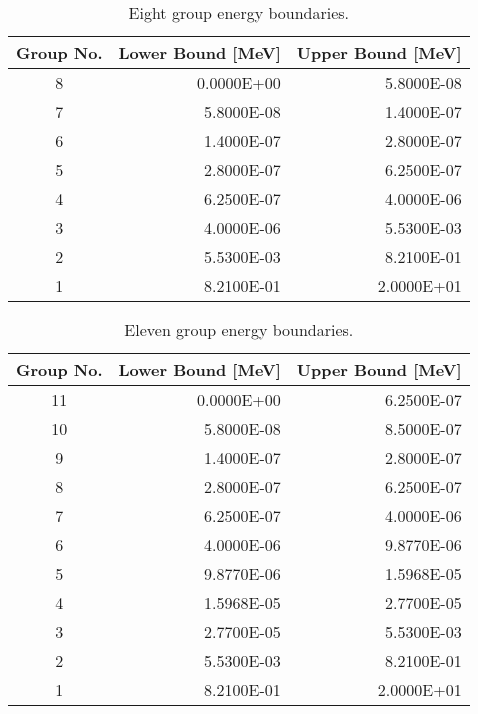 \begin{appendices}
\begin{table}[h!]
  \centering
  \footnotesize
  \caption{Eight group energy boundaries.}
  \label{table:app-8-groups} 
  \vspace{14pt}
  \begin{tabular}{c r r}
    \toprule
    {\bf Group No.} &
    {\bf Lower Bound [MeV]} &
    {\bf Upper Bound [MeV]} \\
    \midrule
8 & 0.0000E+00 & 5.8000E-08 \\
7 & 5.8000E-08 & 1.4000E-07 \\
6 & 1.4000E-07 & 2.8000E-07 \\
5 & 2.8000E-07 & 6.2500E-07 \\
4 & 6.2500E-07 & 4.0000E-06 \\
3 & 4.0000E-06 & 5.5300E-03 \\
2 & 5.5300E-03 & 8.2100E-01 \\
1 & 8.2100E-01 & 2.0000E+01 \\
  \bottomrule
 \end{tabular}
\end{table}

\begin{table}[h!]
	\centering
	\footnotesize
	\caption{Eleven group energy boundaries.}
	\label{table:app-11-groups} 
	\vspace{14pt}
	\begin{tabular}{c r r}
		\toprule
		{\bf Group No.} &
		{\bf Lower Bound [MeV]} &
		{\bf Upper Bound [MeV]} \\
		\midrule
		11 & 0.0000E+00 & 6.2500E-07 \\
		10 & 5.8000E-08 & 8.5000E-07 \\
		9 & 1.4000E-07 & 2.8000E-07 \\
		8 & 2.8000E-07 & 6.2500E-07 \\
		7 & 6.2500E-07 & 4.0000E-06 \\
		6 & 4.0000E-06 & 9.8770E-06 \\
		5 & 9.8770E-06 & 1.5968E-05 \\
		4 & 1.5968E-05 & 2.7700E-05 \\
		3 & 2.7700E-05 & 5.5300E-03 \\
		2 & 5.5300E-03 & 8.2100E-01 \\
		1 & 8.2100E-01 & 2.0000E+01 \\
		\bottomrule
	\end{tabular}
\end{table}


\end{appendices}
